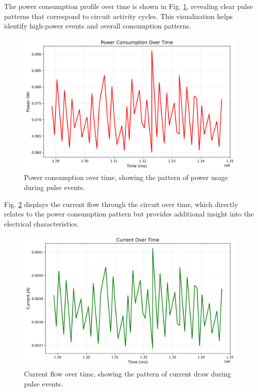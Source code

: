 \documentclass[conference]{IEEEtran}
\begin{document}
The power consumption profile over time is shown in Fig. \ref{fig:power_power}, revealing clear pulse patterns that correspond to circuit activity cycles. This visualization helps identify high-power events and overall consumption patterns.

\begin{figure}[htbp]
    \centering
    \includegraphics[width=\linewidth]{data/power_session_2025-05-09_1440/plots/power_power.png}
    \caption{Power consumption over time, showing the pattern of power usage during pulse events.}
    \label{fig:power_power}
\end{figure}

Fig. \ref{fig:power_current} displays the current flow through the circuit over time, which directly relates to the power consumption pattern but provides additional insight into the electrical characteristics.

\begin{figure}[htbp]
    \centering
    \includegraphics[width=\linewidth]{data/power_session_2025-05-09_1440/plots/power_current.png}
    \caption{Current flow over time, showing the pattern of current draw during pulse events.}
    \label{fig:power_current}
\end{figure}
\end{document}
